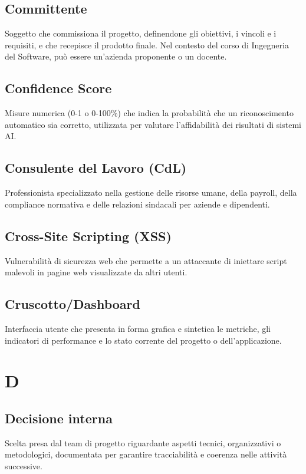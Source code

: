 \documentclass[a4paper,11pt]{article}
\begin{document}
\subsection{Committente}
Soggetto che commissiona il progetto, definendone gli obiettivi, i vincoli e i requisiti, e che recepisce il prodotto finale. Nel contesto del corso di Ingegneria del Software, può essere un'azienda proponente o un docente.

\subsection{Confidence Score}
Misure numerica (0-1 o 0-100\%) che indica la probabilità che un riconoscimento automatico sia corretto, utilizzata per valutare l'affidabilità dei risultati di sistemi AI.

\subsection{Consulente del Lavoro (CdL)}
Professionista specializzato nella gestione delle risorse umane, della payroll, della compliance normativa e delle relazioni sindacali per aziende e dipendenti.

\subsection{Cross-Site Scripting (XSS)}
Vulnerabilità di sicurezza web che permette a un attaccante di iniettare script malevoli in pagine web visualizzate da altri utenti.

\subsection{Cruscotto/Dashboard}
Interfaccia utente che presenta in forma grafica e sintetica le metriche, gli indicatori di performance e lo stato corrente del progetto o dell'applicazione.

\newpage
\section{D}

\subsection{Decisione interna}
Scelta presa dal team di progetto riguardante aspetti tecnici, organizzativi o metodologici, documentata per garantire tracciabilità e coerenza nelle attività successive.
\end{document}
